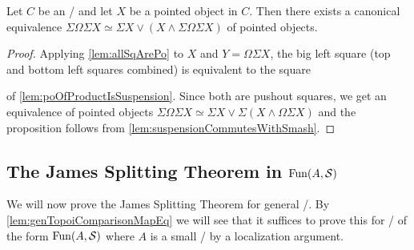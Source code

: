 \begin{corollary}\label{cor:fundamentalJamesSplitting}
    Let $C$ be an \inftytop/ and let $X$ be a pointed object in $C$. 
    Then there exists a canonical equivalence $\Sigma\Omega\Sigma X\simeq\Sigma X\vee\left(X\wedge\Sigma\Omega\Sigma X\right)$ of pointed objects.
    \begin{proof}
        Applying \cref{lem:allSqArePo} to $X$ and $Y=\Omega\Sigma X$, the big left square (top and bottom left squares combined) is equivalent to the square 
        \begin{center}
        \end{center}
        of \cref{lem:poOfProductIsSuspension}.
        Since both are pushout squares, we get an equivalence of pointed objects $\Sigma\Omega\Sigma X\simeq\Sigma X\vee\Sigma\left(X\wedge\Omega\Sigma X\right)$ and the proposition follows from \cref{lem:suspensionCommutesWithSmash}.
    \end{proof}
\end{corollary}
\subsection*{The James Splitting Theorem in $\operatorname{Fun}(A,\mathcal{S})$}
We will now prove the James Splitting Theorem for general \inftytops/.
By \cref{lem:genTopoiComparisonMapEq} we will see that it suffices to prove this for \inftytops/ of the form $\operatorname{Fun}(A,\mathcal{S})$ where $A$ is a small \inftycat/ by a localization argument.

